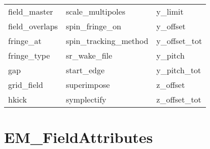\begin{tabular}{lll}
field_master                & scale_multipoles            & y_limit                     \\
field_overlaps              & spin_fringe_on              & y_offset                    \\
fringe_at                   & spin_tracking_method        & y_offset_tot                \\
fringe_type                 & sr_wake_file                & y_pitch                     \\
gap                         & start_edge                  & y_pitch_tot                 \\
grid_field                  & superimpose                 & z_offset                    \\
hkick                       & symplectify                 & z_offset_tot                \\
 \bottomrule
 \end{tabular}
 \vfill
 
 \section{EM_FieldAttributes}
 \label{s:list.em.field}
 
